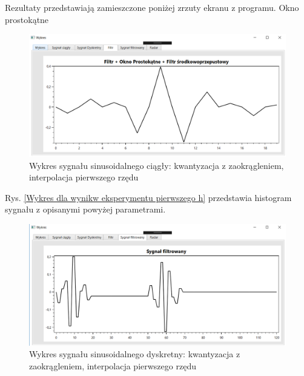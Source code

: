 \documentclass[12pt]{article}
\begin{document}
Rezultaty przedstawiają zamieszczone poniżej zrzuty ekranu z programu. 
\newpage
Okno prostokątne
\begin{figure}[h!]
 \centering
 \includegraphics[width=12.3cm]{prostFSOP.PNG}
 \vspace{-0.3cm}
 \caption{Wykres sygnału sinusoidalnego ciągły: kwantyzacja z zaokrągleniem, interpolacja pierwszego rzędu}
 \label{Wykres dla wyników eksperymentu drugiego}
\end{figure}
\newpage
Rys. \ref{Wykres dla wynikw eksperymentu pierwszego h} przedstawia histogram sygnału z opisanymi powyżej parametrami. 
\begin{figure}[h!]
 \centering
 \includegraphics[width=12.3cm]{prostSFSP.PNG}
 \vspace{-0.3cm}
 \caption{Wykres sygnału sinusoidalnego dyskretny: kwantyzacja z zaokrągleniem, interpolacja pierwszego rzędu}
 \label{Histogram dla wyników eksperymentu drugiego}
\end{figure}
\end{document}
